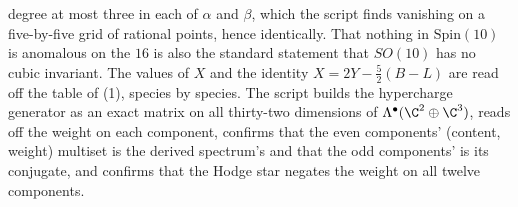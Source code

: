 degree at most three in each of $\alpha$ and $\beta$, which the script finds vanishing on a five-by-five grid of rational points, hence identically. That nothing in $\mathrm{Spin}(10)$ is anomalous on the $16$ is also the standard statement that $SO(10)$ has no cubic invariant. The values of $X$ and the identity $X = 2Y - \tfrac52(B - L)$ are read off the table of (1), species by species. The script builds the hypercharge generator as an exact matrix on all thirty-two dimensions of $\Lambda^{\bullet}(\C^{2} \oplus \C^{3})$, reads off the weight on each component, confirms that the even components' (content, weight) multiset is the derived spectrum's and that the odd components' is its conjugate, and confirms that the Hodge star negates the weight on all twelve components.
